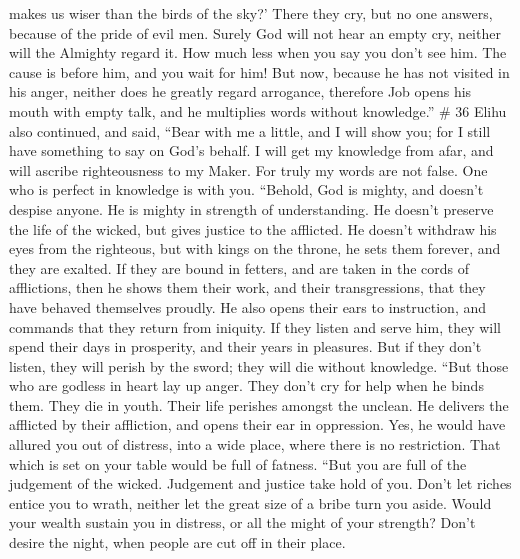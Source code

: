 makes us wiser than the birds of the sky?'  There they
cry, but no one answers, because of the pride of evil men.
 Surely God will not hear an empty cry, neither will the
Almighty regard it.  How much less when you say you don't
see him. The cause is before him, and you wait for him! 
But now, because he has not visited in his anger, neither does he
greatly regard arrogance,  therefore Job opens his mouth
with empty talk, and he multiplies words without knowledge.'' \# 36
 Elihu also continued, and said,  ``Bear
with me a little, and I will show you; for I still have something to say
on God's behalf.  I will get my knowledge from afar, and
will ascribe righteousness to my Maker.  For truly my
words are not false. One who is perfect in knowledge is with you.
 ``Behold, God is mighty, and doesn't despise anyone. He
is mighty in strength of understanding.  He doesn't
preserve the life of the wicked, but gives justice to the afflicted.
 He doesn't withdraw his eyes from the righteous, but with
kings on the throne, he sets them forever, and they are exalted.
 If they are bound in fetters, and are taken in the cords
of afflictions,  then he shows them their work, and their
transgressions, that they have behaved themselves proudly.
 He also opens their ears to instruction, and commands
that they return from iniquity.  If they listen and serve
him, they will spend their days in prosperity, and their years in
pleasures.  But if they don't listen, they will perish by
the sword; they will die without knowledge.  ``But those
who are godless in heart lay up anger. They don't cry for help when he
binds them.  They die in youth. Their life perishes
amongst the unclean.  He delivers the afflicted by their
affliction, and opens their ear in oppression.  Yes, he
would have allured you out of distress, into a wide place, where there
is no restriction. That which is set on your table would be full of
fatness.  ``But you are full of the judgement of the
wicked. Judgement and justice take hold of you.  Don't
let riches entice you to wrath, neither let the great size of a bribe
turn you aside.  Would your wealth sustain you in
distress, or all the might of your strength?  Don't
desire the night, when people are cut off in their place.
